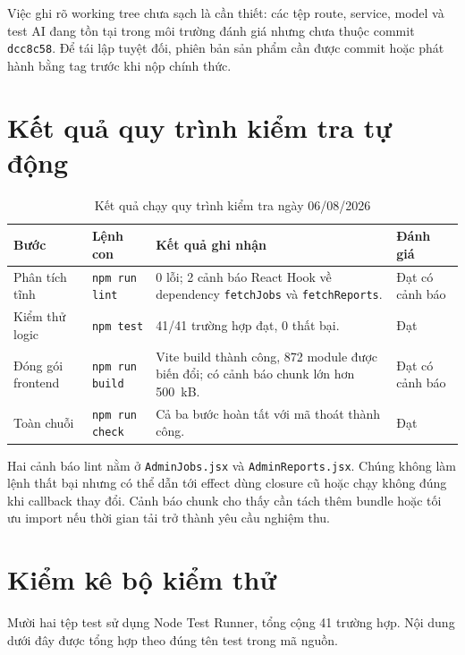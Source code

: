 Việc ghi rõ working tree chưa sạch là cần thiết: các tệp route, service, model và test AI đang tồn tại trong môi trường đánh giá nhưng chưa thuộc commit \texttt{dcc8c58}. Để tái lập tuyệt đối, phiên bản sản phẩm cần được commit hoặc phát hành bằng tag trước khi nộp chính thức.

\section{Kết quả quy trình kiểm tra tự động}

\begin{table}[H]
    \centering
    \small
    \begin{tabularx}{\textwidth}{|p{}|p{}|Y|p{0.13\textwidth}|} \hline
        \textbf{Bước} & \textbf{Lệnh con} & \textbf{Kết quả ghi nhận} & \textbf{Đánh giá} \\ \hline
        Phân tích tĩnh & \texttt{npm run lint} & 0 lỗi; 2 cảnh báo React Hook về dependency \texttt{fetchJobs} và \texttt{fetchReports}. & Đạt có cảnh báo \\ \hline
        Kiểm thử logic & \texttt{npm test} & 41/41 trường hợp đạt, 0 thất bại. & Đạt \\ \hline
        Đóng gói frontend & \texttt{npm run build} & Vite build thành công, 872 module được biến đổi; có cảnh báo chunk lớn hơn 500~kB. & Đạt có cảnh báo \\ \hline
        Toàn chuỗi & \texttt{npm run check} & Cả ba bước hoàn tất với mã thoát thành công. & Đạt \\ \hline
    \end{tabularx}
    \caption{Kết quả chạy quy trình kiểm tra ngày 06/08/2026}
    \label{tab:check-results}
\end{table}

Hai cảnh báo lint nằm ở \texttt{AdminJobs.jsx} và \texttt{AdminReports.jsx}. Chúng không làm lệnh thất bại nhưng có thể dẫn tới effect dùng closure cũ hoặc chạy không đúng khi callback thay đổi. Cảnh báo chunk cho thấy cần tách thêm bundle hoặc tối ưu import nếu thời gian tải trở thành yêu cầu nghiệm thu.

\section{Kiểm kê bộ kiểm thử}

Mười hai tệp test sử dụng Node Test Runner, tổng cộng 41 trường hợp. Nội dung dưới đây được tổng hợp theo đúng tên test trong mã nguồn.

